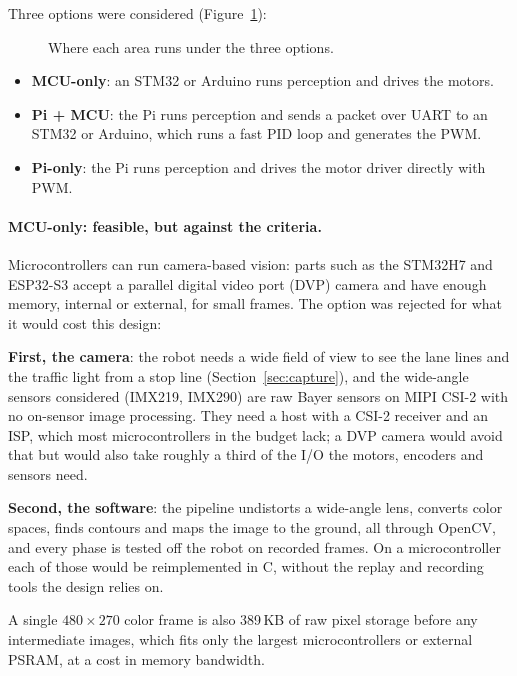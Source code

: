 Three options were considered (Figure~\ref{fig:board-options}):

\begin{figure}[H]
      \centering
      
      \caption{Where each area runs under the three options.}
      \label{fig:board-options}
\end{figure}

\begin{itemize}
      \item \textbf{MCU-only}: an STM32 or Arduino runs perception and drives
            the motors.
      \item \textbf{Pi + MCU}: the Pi runs perception and sends a packet over
            UART to an STM32 or Arduino, which runs a fast PID loop and
            generates the PWM.
      \item \textbf{Pi-only}: the Pi runs perception and drives the motor
            driver directly with PWM.
\end{itemize}

\paragraph{MCU-only: feasible, but against the criteria.}
Microcontrollers can run camera-based vision: parts such as the STM32H7 and
ESP32-S3 accept a parallel digital video port (DVP) camera and have enough
memory, internal or external, for small frames. The option was rejected for
what it would cost this design:

\textbf{First, the camera}: the robot needs a wide field of view to see the lane lines
and the traffic light from a stop line (Section~\ref{sec:capture}), and the
wide-angle sensors considered (IMX219, IMX290) are raw Bayer sensors on MIPI
CSI-2 with no on-sensor image processing. They need a host with a CSI-2
receiver and an ISP, which most microcontrollers in the budget lack; a DVP
camera would avoid that but would also take roughly a third of the I/O the
motors, encoders and sensors need.

\textbf{Second, the software}: the pipeline undistorts a wide-angle lens, converts color
spaces, finds contours and maps the image to the ground, all through OpenCV,
and every phase is tested off the robot on recorded frames. On a
microcontroller each of those would be reimplemented in C, without the replay
and recording tools the design relies on.

A single $480\times270$ color frame is also 389\,KB of raw pixel storage before
any intermediate images, which fits only the largest microcontrollers or
external PSRAM, at a cost in memory bandwidth.


